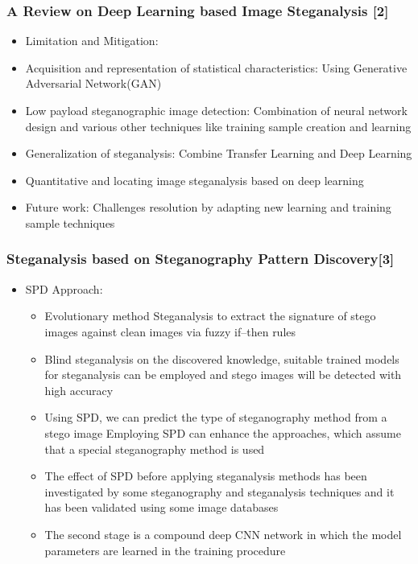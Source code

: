 \documentclass{beamer} %
\theoremstyle{definition} %
\begin{document}
\begin{frame}
\frametitle{A Review on Deep Learning based Image Steganalysis [2]   }
\begin{itemize}
	\item{Limitation and Mitigation:}
\end{itemize}
	\begin{itemize}
		\item {Acquisition and representation of statistical characteristics: Using  Generative Adversarial Network(GAN)  }
		\item {Low payload steganographic image detection: Combination of neural network design and various other techniques like training sample creation and learning }
		\item {Generalization of steganalysis: Combine Transfer Learning and Deep Learning}
		\item {Quantitative and locating image steganalysis based on
			deep learning }
	\end{itemize}
\begin{itemize}
	\item{Future work: Challenges resolution by adapting new learning and training sample techniques  }
\end{itemize}
\end{frame}

\begin{frame}
\frametitle{Steganalysis based on Steganography Pattern Discovery[3] }
\begin{itemize}
	\item SPD Approach:
	\begin{itemize}
		\item Evolutionary method Steganalysis to extract the signature of stego images against clean images via fuzzy if–then rules  
		
		\item Blind steganalysis on the discovered knowledge, suitable trained models for steganalysis can be employed and stego images will be detected with high accuracy   
		\item Using SPD, we can predict the type of steganography method from a stego image   Employing SPD can enhance the approaches, which
		assume that a special steganography method is used 
		\item The effect of SPD before applying steganalysis methods has been investigated by some steganography and steganalysis techniques and it has been validated using some image databases  
		\item The second stage is a compound deep CNN network in which the model parameters are learned in the training procedure 
	\end{itemize}
\end{itemize}
\end{frame}
\end{document}
